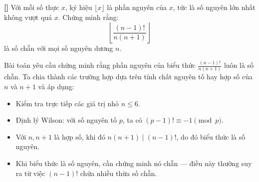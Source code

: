 \documentclass[../05-modular-arithmetic-a.tex]{subfiles}
\begin{document}
\begin{example*}\label{example:THA-2015-MO-P5}\textbf{[]}
    Với mỗi số thực \( x \), ký hiệu \( \lfloor x \rfloor \) là phần nguyên của \( x \), tức là số nguyên lớn nhất không vượt quá \( x \).
    Chứng minh rằng:
    \[
        \left\lfloor \frac{(n - 1)!}{n(n + 1)} \right\rfloor
    \]
    là số chẵn với mọi số nguyên dương \( n \).    
\end{example*}

\begin{story*}
    Bài toán yêu cầu chứng minh rằng phần nguyên của biểu thức \( \frac{(n - 1)!}{n(n + 1)} \) luôn là số chẵn.  
    Ta chia thành các trường hợp dựa trên tính chất nguyên tố hay hợp số của \( n \) và \( n + 1 \) và áp dụng:
    \begin{itemize}[topsep=0pt, partopsep=0pt, itemsep=0pt]
        \item Kiểm tra trực tiếp các giá trị nhỏ \( n \le 6 \).
        \item Định lý Wilson: với số nguyên tố \( p \), ta có \( (p - 1)! \equiv -1 \pmod{p} \).
        \item Với \( n, n + 1 \) là hợp số, khi đó \( n(n+1) \mid (n - 1)! \), do đó biểu thức là số nguyên.
        \item Khi biểu thức là số nguyên, cần chứng minh nó chẵn — điều này thường suy ra từ việc \( (n-1)! \) chứa nhiều thừa số chẵn.
    \end{itemize}
\end{story*}

\bigbreak
\end{document}
